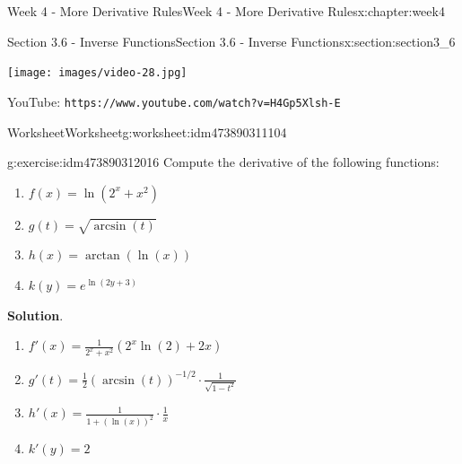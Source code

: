 \documentclass[oneside,10pt,]{book}
\newcommand{\blocktitlefont}{\relax}
\newcommand{\mono}[1]{\texttt{#1}}
\numberwithin{equation}{section}
\newlength{\qrsize}
\newlength{\previewwidth}
\begin{document}
\begin{chapterptx}{Week 4 - More Derivative Rules}{}{Week 4 - More Derivative Rules}{}{}{x:chapter:week4}
\begin{sectionptx}{Section 3.6 - Inverse Functions}{}{Section 3.6 - Inverse Functions}{}{}{x:section:section3_6}
\begin{tcbraster}[raster columns=2, raster column skip=1pt, raster halign=center, raster force size=false, raster left skip=0pt, raster right skip=0pt]
\begin{tcolorbox}[previewstyle, width=\previewwidth]%
\texttt{[image: images/video-28.jpg]}%
\end{tcolorbox}%
\begin{tcolorbox}[qrstyle]%
{\hypersetup{urlcolor=black}}%
\end{tcolorbox}%
\begin{tcolorbox}[captionstyle]%
\small YouTube: \mono{https://www.youtube.com/watch?v=H4Gp5Xlsh-E}\end{tcolorbox}%
\end{tcbraster}%
%
%
\typeout{************************************************}
\typeout{************************************************}
%
\begin{worksheet-subsection}{Worksheet}{}{Worksheet}{}{}{g:worksheet:idm473890311104}
\begin{divisionexercise}{1}{}{}{g:exercise:idm473890312016}%
Compute the derivative of the following functions:%
%
\begin{enumerate}[label=(\alph*)]
\item{}\(\displaystyle f(x) = \ln(2^x+x^2)\)%
\item{}\(\displaystyle g(t) = \sqrt{\arcsin(t)}\)%
\item{}\(\displaystyle h(x) = \arctan(\ln(x))\)%
\item{}\(\displaystyle k(y) = e^{\ln (2y+3)}\)%
\end{enumerate}
\textbf{\blocktitlefont Solution}.\hypertarget{g:solution:idm473890316128}{}\quad{}%
\begin{enumerate}[label=(\alph*)]
\item{}\(\displaystyle f'(x) = \frac{1}{2^x+x^2} (2^x\ln(2)+2x)\)%
\item{}\(\displaystyle g'(t) = \frac 12(\arcsin(t))^{-1/2} \cdot \frac{1}{\sqrt{1-t^2}}\)%
\item{}\(\displaystyle h'(x) = \frac{1}{1+(\ln(x))^2}\cdot \frac 1x\)%
\item{}\(\displaystyle k'(y) = 2\)%
\end{enumerate}
\end{divisionexercise}%
\end{worksheet-subsection}
\restoregeometry
\setlength{\qrsize}{9em}
\setlength{\previewwidth}{\linewidth}
\addtolength{\previewwidth}{-\qrsize}
\begin{tcbraster}[raster columns=2, raster column skip=1pt, raster halign=center, raster force size=false, raster left skip=0pt, raster right skip=0pt]%

\end{tcbraster}
\end{sectionptx}
\end{chapterptx}
\end{document}
